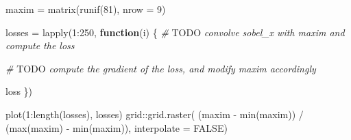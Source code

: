 \documentclass[
  a4paper,
]{article}
\newenvironment{Shaded}{\begin{snugshade}}{\end{snugshade}}
\newcommand{\AlertTok}[1]{\textcolor[rgb]{0.94,0.16,0.16}{#1}}
\newcommand{\AttributeTok}[1]{\textcolor[rgb]{0.77,0.63,0.00}{#1}}
\newcommand{\CommentTok}[1]{\textcolor[rgb]{0.56,0.35,0.01}{\textit{#1}}}
\newcommand{\ConstantTok}[1]{\textcolor[rgb]{0.00,0.00,0.00}{#1}}
\newcommand{\ControlFlowTok}[1]{\textcolor[rgb]{0.13,0.29,0.53}{\textbf{#1}}}
\newcommand{\DecValTok}[1]{\textcolor[rgb]{0.00,0.00,0.81}{#1}}
\newcommand{\FunctionTok}[1]{\textcolor[rgb]{0.00,0.00,0.00}{#1}}
\newcommand{\NormalTok}[1]{#1}
\newcommand{\OtherTok}[1]{\textcolor[rgb]{0.56,0.35,0.01}{#1}}
\newcommand{\SpecialCharTok}[1]{\textcolor[rgb]{0.00,0.00,0.00}{#1}}
\begin{document}
\begin{Shaded}
\begin{Highlighting}[]
\NormalTok{maxim }\OtherTok{=} \FunctionTok{matrix}\NormalTok{(}\FunctionTok{runif}\NormalTok{(}\DecValTok{81}\NormalTok{), }\AttributeTok{nrow =} \DecValTok{9}\NormalTok{)}

\NormalTok{losses }\OtherTok{=} \FunctionTok{lapply}\NormalTok{(}\DecValTok{1}\SpecialCharTok{:}\DecValTok{250}\NormalTok{, }\ControlFlowTok{function}\NormalTok{(i) \{}
  \CommentTok{\# }\AlertTok{TODO}\CommentTok{ convolve \textasciigrave{}sobel\_x\textasciigrave{} with \textasciigrave{}maxim\textasciigrave{} and compute the loss}

  \CommentTok{\# }\AlertTok{TODO}\CommentTok{ compute the gradient of the loss, and modify \textasciigrave{}maxim\textasciigrave{} accordingly}
  
\NormalTok{  loss}
\NormalTok{\})}

\FunctionTok{plot}\NormalTok{(}\DecValTok{1}\SpecialCharTok{:}\FunctionTok{length}\NormalTok{(losses), losses)}
\NormalTok{grid}\SpecialCharTok{::}\FunctionTok{grid.raster}\NormalTok{(}
\NormalTok{  (maxim }\SpecialCharTok{{-}} \FunctionTok{min}\NormalTok{(maxim)) }\SpecialCharTok{/}\NormalTok{ (}\FunctionTok{max}\NormalTok{(maxim) }\SpecialCharTok{{-}} \FunctionTok{min}\NormalTok{(maxim)),}
  \AttributeTok{interpolate =} \ConstantTok{FALSE}\NormalTok{)}
\end{Highlighting}
\end{Shaded}
\end{document}
